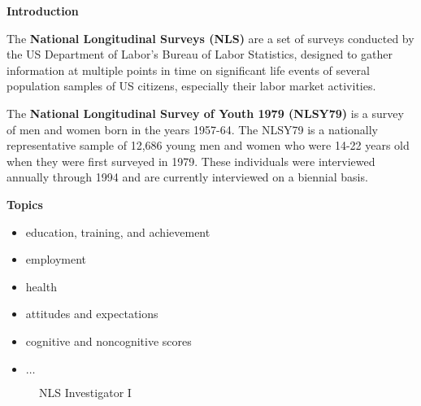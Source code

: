 \begin{frame}\begin{center}
    \LARGE\textbf{Introduction}
\end{center}\end{frame}
\begin{frame}
The \textbf{National Longitudinal Surveys (NLS)} are a set of surveys conducted by the US Department of Labor's Bureau of Labor Statistics, designed to gather information at multiple points in time on significant life events of several population samples of US citizens, especially their labor market activities.
\end{frame}
\begin{frame}
The \textbf{National Longitudinal Survey of Youth 1979 (NLSY79)} is a survey of men and women born in the years 1957-64. The NLSY79 is a nationally representative sample of 12,686 young men and women who were 14-22 years old when they were first surveyed in 1979. These individuals were interviewed annually through 1994 and are currently interviewed on a biennial basis.
\end{frame}
\begin{frame}\textbf{Topics}\vspace{0.3cm}
\begin{itemize}\setlength\itemsep{1em}
\item education, training, and achievement
\item employment
\item health
\item attitudes and expectations
\item cognitive and noncognitive scores
\item $\hdots$
\end{itemize}
\end{frame}
\begin{frame}\begin{figure}[htp]\centering
\caption{NLS Investigator I}
\end{figure}\end{frame}

